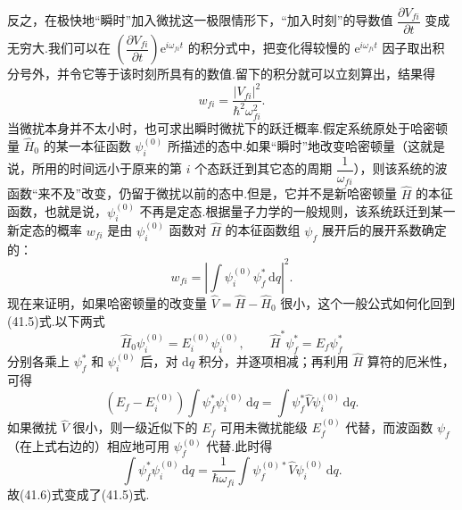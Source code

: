 反之，在极快地“瞬时”加入微扰这一极限情形下，“加入时刻”的导数值 $\dfrac{\partial V_{fi}}{\partial t}$ 变成无穷大.我们可以在 $\left(\dfrac{\partial V_{fi}}{\partial t}\right)\mathrm{e}^{i\omega_{fi}t}$ 的积分式中，把变化得较慢的 $\mathrm{e}^{i\omega_{fi}t}$ 因子取出积分号外，并令它等于该时刻所具有的数值.留下的积分就可以立刻算出，结果得
\begin{equation}
  w_{fi}=\frac{|V_{fi}|^2}{\hbar^2\omega_{fi}^2}.
\end{equation}
当微扰本身并不太小时，也可求出瞬时微扰下的跃迁概率.假定系统原处于哈密顿量 $\hat{H}_0$ 的某一本征函数 $\psi_i^{(0)}$ 所描述的态中.如果“瞬时”地改变哈密顿量（这就是说，所用的时间远小于原来的第 $i$ 个态跃迁到其它态的周期 $\dfrac{1}{\omega_{fi}}$），则该系统的波函数“来不及”改变，仍留于微扰以前的态中.但是，它并不是新哈密顿量 $\hat{H}$ 的本征函数，也就是说，$\psi_i^{(0)}$ 不再是定态.根据量子力学的一般规则，该系统跃迁到某一新定态的概率 $w_{fi}$ 是由 $\psi_i^{(0)}$ 函数对 $\hat{H}$ 的本征函数组 $\psi_f$ 展开后的展开系数确定的：
\begin{equation}
  w_{fi}=\left|\int\psi_i^{(0)}\psi_f^{*}\,\mathrm{d}q\right|^2.
\end{equation}
现在来证明，如果哈密顿量的改变量 $\hat{V}=\hat{H}-\hat{H}_0$ 很小，这个一般公式如何化回到(41.5)式.以下两式
\begin{equation*}
  \hat{H}_0\psi_i^{(0)}=E_i^{(0)}\psi_i^{(0)},\qquad
  \hat{H}^{*}\psi_f^{*}=E_f\psi_f^{*}
\end{equation*}
分别各乘上 $\psi_f^{*}$ 和 $\psi_i^{(0)}$ 后，对 $\mathrm{d}q$ 积分，并逐项相减；再利用 $\hat{H}$ 算符的厄米性，可得
\begin{equation*}
  \left(E_f-E_i^{(0)}\right)\int\psi_f^{*}\psi_i^{(0)}\,\mathrm{d}q
  =\int\psi_f^{*}\hat{V}\psi_i^{(0)}\,\mathrm{d}q.
\end{equation*}
如果微扰 $\hat{V}$ 很小，则一级近似下的 $E_f$ 可用未微扰能级 $E_f^{(0)}$ 代替，而波函数 $\psi_f$（在上式右边的）相应地可用 $\psi_f^{(0)}$ 代替.此时得
\begin{equation*}
  \int\psi_f^{*}\psi_i^{(0)}\,\mathrm{d}q
  =\frac{1}{\hbar\omega_{fi}}\int\psi_f^{(0)*}\hat{V}\psi_i^{(0)}\,\mathrm{d}q.
\end{equation*}
故(41.6)式变成了(41.5)式.


